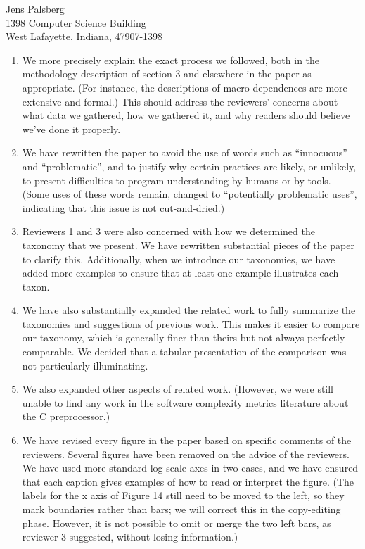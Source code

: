 \documentclass[11pt]{letter}
\begin{document}
\begin{letter}{Jens Palsberg \\
    1398 Computer Science Building \\
    West Lafayette, Indiana, 47907-1398}
\begin{enumerate}
\item
  We more precisely explain the exact process we followed, both in the
  methodology description of section 3 and elsewhere in the paper as
  appropriate.  (For instance, the descriptions of macro dependences are
  more extensive and formal.)  This should address the reviewers' concerns
  about what data we gathered, how we gathered it, and why readers should
  believe we've done it properly.

\item
  We have rewritten the paper to avoid the use of words such as ``innocuous''
  and ``problematic'', and to justify why certain practices are likely, or
  unlikely, to present difficulties to program understanding by humans or
  by tools.  (Some uses of these words remain, changed to ``potentially
  problematic uses'', indicating that this issue is not cut-and-dried.)

\item
  Reviewers 1 and 3 were also concerned with how we determined the taxonomy
  that we present.  We have rewritten substantial pieces of the paper to
  clarify this.  Additionally, when we introduce our taxonomies, we have
  added more examples to ensure that at least one example illustrates each
  taxon.

\item
  We have also substantially expanded the related work to fully summarize
  the taxonomies and suggestions of previous work.  This makes it easier to
  compare our taxonomy, which is generally finer than theirs but not always
  perfectly comparable.  We decided that a tabular presentation of the
  comparison was not particularly illuminating.

\item
  We also expanded other aspects of related work.  (However, we were still
  unable to find any work in the software complexity metrics literature
  about the C preprocessor.)

\item
  We have revised every figure in the paper based on specific comments of
  the reviewers.  Several figures have been removed on the advice of the
  reviewers.  We have used more standard log-scale axes in two cases, and we
  have ensured that each caption gives examples of how to read or interpret
  the figure.  (The labels for the x axis of Figure 14 still need to be
  moved to the left, so they mark boundaries rather than bars; we will
  correct this in the copy-editing phase.  However, it is not possible to
  omit or merge the two left bars, as reviewer 3 suggested, without losing
  information.)


\end{enumerate}
\end{letter}
\end{document}
